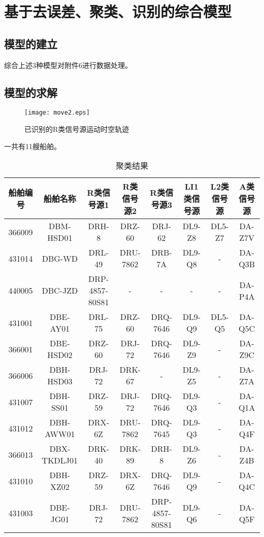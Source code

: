 \clearpage
\section{基于去误差、聚类、识别的综合模型}
\subsection{模型的建立}
综合上述3种模型对附件6进行数据处理。
\subsection{模型的求解}
\begin{figure}[htbp]
	\centering
	\caption{已识别的R类信号源运动时空轨迹}
	\texttt{[image: move2.eps]}
\end{figure}
\par 一共有11艘船舶。
\begin{table}[htbp]
	\centering
	\caption{聚类结果}\tiny
	\begin{tabular}{cccccccc}
		\toprule
		船舶编号   & 船舶名称        & R类信号源1         & R类信号源2   & R类信号源3         & LI1类信号源 & L2类信号源 & A类信号源  \\
		\midrule
		366009 & DBM-HSD01   & DRH-8          & DRZ-60   & DRJ-62         & DL9-Z8  & DL5-Z7 & DA-Z7V \\
		431014 & DBG-WD      & DRL-49         & DRU-7862 & DRB-7A         & DL9-Q8  & -      & DA-Q3B \\
		440005 & DBC-JZD     & DRP-4857-80S81 & -        & -              & -       & -      & DA-P4A \\
		431001 & DBE-AY01    & DRL-75         & DRZ-60   & DRQ-7646       & DL9-Q9  & DL5-Q5 & DA-Q5C \\
		366001 & DBE-HSD02   & DRZ-60         & DRJ-72   & DRQ-7646       & DL9-Z9  & -      & DA-Z9C \\
		366006 & DBH-HSD03   & DRJ-72         & DRK-67   & -              & DL9-Z5  & -      & DA-Z7A \\
		431007 & DBH-SS01    & DRZ-59         & DRJ-72   & DRQ-7646       & DL9-Q3  & -      & DA-Q1A \\
		431012 & DBH-AWW01   & DRX-6Z         & DRU-7862 & DRQ-7645       & DL9-Q3  & -      & DA-Q4F \\
		366013 & DBX-TKDLJ01 & DRK-40         & DRK-89   & DRH-8          & DL9-Z6  & -      & DA-Z4B \\
		431010 & DBH-XZ02    & DRZ-59         & DRX-6Z   & DRQ-7646       & DL9-Q9  & -      & DA-Q4C \\
		431003 & DBE-JG01    & DRJ-72         & DRU-7862 & DRP-4857-80S81 & DL9-Q6  & -      & DA-Q5F\\
		\bottomrule
	\end{tabular}
\end{table}
